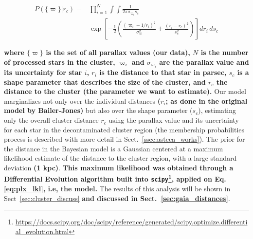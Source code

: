 \documentclass[referee]{aa}
\begin{document}
\begin{equation}
\begin{aligned}
P\left(\{\varpi\} | r_{c}\right)
= & {} \prod_{i=1}^{N} \int \int \frac{1}{2 \pi \sigma_{\varpi_{i}} s_{c}} \\
& \exp \left[-\frac{1}{2} \left( \frac{\left(\varpi_{i}-1 / r_{i}\right)^{2}}{
\sigma_{\varpi}^{2}} + \frac{\left(r_{i}-r_{c}\right)^{2}}{s_{c}^
{2}}\right)\right]
d r_{i}\,d s_{c}
\label{eq:plx_lkl}
\end{aligned}
\end{equation}

\noindent \textbf{where $\{\varpi\}$ is the set of all parallax values (our
data), $N$ is the number of processed stars in the cluster,
$\varpi_{i}$ and $\sigma_{\varpi_{i}}$ are the parallax value and its
uncertainty for star $i$, $r_{i}$ is the distance to that star in parsec,
$s_{c}$ is a shape parameter that describes the size of the cluster, and
$r_{c}$ the distance to the cluster (the parameter we want to estimate).}
%
Our model marginalizes not only over the individual distances \textbf{($r_i$;
as done in the original model by Bailer-Jones)} but also
over the shape parameter ($s_c$), estimating only the overall cluster distance
$r_c$ using the parallax value and its uncertainty for each star in the
decontaminated cluster region (the membership probabilities process is
described with more detail in Sect.~\ref{ssec:asteca_works}).
%
The prior for the distance in the Bayesian model is a Gaussian centered at a
maximum likelihood estimate of the distance to the cluster region, with a large
standard deviation \textbf{(1 kpc)}. \textbf{This maximum likelihood was
obtained through a Differential Evolution algorithm built into
\texttt{scipy}\footnote{\url{https://docs.scipy.org/doc/scipy/reference/generated/scipy.optimize.differential_evolution.html}},
applied on Eq. \ref{eq:plx_lkl}, i.e, the model.}
%
The results of this analysis will be shown in Sect~\ref{sec:cluster_discuss}
\textbf{and discussed in Sect.~\ref{sec:gaia_distances}}.
\end{document}
